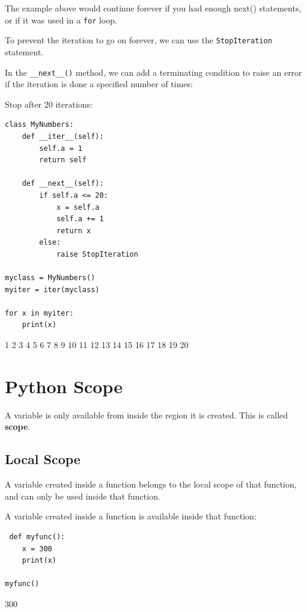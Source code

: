 \documentclass[12pt,a4paper]{article}
\newcommand{\code}[1]{%
	\colorbox{backcolour}{\lstinline{#1}}%
}
\begin{document}
The example above would continue forever if you had enough next()
statements, or if it was used in a \code{for} loop.

To prevent the iteration to go on forever, we can use the
\code{StopIteration} statement.

In the \code{__next__()} method, we can add a terminating condition to
raise an error if the iteration is done a specified number of times:

\begin{ebox}
Stop after 20 iterations:
	\begin{lstlisting}
class MyNumbers:
    def __iter__(self):
        self.a = 1
        return self

    def __next__(self):
        if self.a <= 20:
            x = self.a
            self.a += 1
            return x
        else:
            raise StopIteration

myclass = MyNumbers()
myiter = iter(myclass)

for x in myiter:
    print(x)
	\end{lstlisting}
\tcblower
	\begin{vercode}
1
2
3
4
5
6
7
8
9
10
11
12
13
14
15
16
17
18
19
20
	\end{vercode}
\end{ebox}
\vfill\newpage
\section{Python Scope}

A variable is only available from inside the region it is created. This is
called \textbf{scope}.

\subsection{Local Scope}

A variable created inside a function belongs to the local scope of that
function, and can only be used inside that function.

\begin{ebox}
A variable created inside a function is available inside that function:
	\begin{lstlisting}
 def myfunc():
    x = 300
    print(x)

myfunc()
	\end{lstlisting}
\tcblower
	\begin{vercode}
300
	\end{vercode}
\end{ebox}
\end{document}
